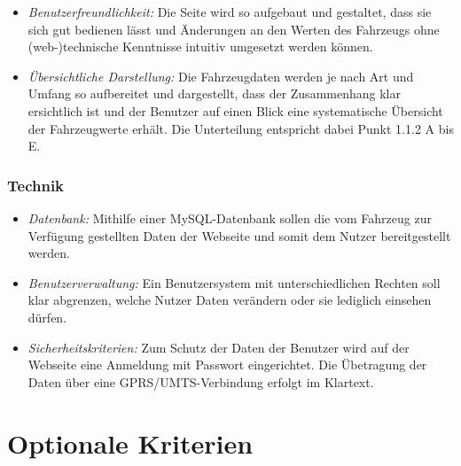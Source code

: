 \documentclass[fontsize = 12pt, paper = a4]{scrreprt}
\begin{document}
\begin{itemize}

\item \textit{Benutzerfreundlichkeit:}
Die Seite wird so aufgebaut und gestaltet, dass sie sich gut bedienen lässt und Änderungen an den Werten des Fahrzeugs ohne (web-)technische Kenntnisse intuitiv umgesetzt werden können.


\item \textit{Übersichtliche Darstellung:}
Die Fahrzeugdaten werden je nach Art und Umfang so aufbereitet und dargestellt, dass der Zusammenhang klar ersichtlich ist und der Benutzer auf einen Blick eine systematische Übersicht der Fahrzeugwerte erhält. Die Unterteilung entspricht dabei Punkt 1.1.2 A bis E.

\end{itemize}



\subsubsection{Technik}

\begin{itemize}

\item \textit{Datenbank:}
Mithilfe einer \gls{MySQL}-Datenbank sollen die vom Fahrzeug zur Verfügung gestellten Daten der Webseite und somit dem Nutzer bereitgestellt werden.


\item \textit{Benutzerverwaltung:} 
Ein Benutzersystem mit unterschiedlichen \gls{Recht}en soll klar abgrenzen, welche Nutzer Daten verändern oder sie lediglich einsehen dürfen.


\item \textit{Sicherheitskriterien:}
Zum Schutz der Daten der Benutzer wird auf der Webseite eine Anmeldung mit Passwort eingerichtet. Die Übetragung der Daten über eine GPRS/UMTS-Verbindung erfolgt im Klartext.
 
\end{itemize} 


\section{Optionale Kriterien}
\end{document}
